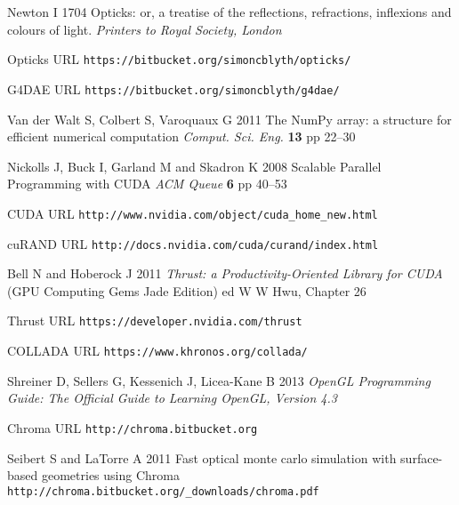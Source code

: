 \documentclass[a4paper]{jpconf}
\begin{document}
\begin{thebibliography}{9}
Newton I 
1704 
Opticks: or, a treatise of the reflections, refractions, inflexions and colours of light.
{\it Printers to Royal Society, London} 

Opticks URL {\tt https://bitbucket.org/simoncblyth/opticks/}

G4DAE URL {\tt https://bitbucket.org/simoncblyth/g4dae/}

Van der Walt S, Colbert S, Varoquaux G 
2011 
The NumPy array: a structure for efficient numerical computation
{\it Comput. Sci. Eng.} {\bf 13} pp 22--30

Nickolls J, Buck I, Garland M and Skadron K 
2008
Scalable Parallel Programming with CUDA
{\it ACM Queue} {\bf 6} pp 40--53

CUDA URL {\tt http://www.nvidia.com/object/cuda\_home\_new.html}

cuRAND URL {\tt http://docs.nvidia.com/cuda/curand/index.html}


Bell N and Hoberock J 
2011
{\it Thrust: a Productivity-Oriented Library for CUDA}
(GPU Computing Gems Jade Edition) ed W W Hwu, Chapter 26   

Thrust URL {\tt https://developer.nvidia.com/thrust}

COLLADA URL {\tt https://www.khronos.org/collada/}

Shreiner D, Sellers G, Kessenich J, Licea-Kane B 
2013
{\it OpenGL Programming Guide: The Official Guide to Learning OpenGL, Version 4.3}


Chroma URL {\tt http://chroma.bitbucket.org}

Seibert S and LaTorre A 
2011 
Fast optical monte carlo simulation with surface-based geometries using Chroma {\tt http://chroma.bitbucket.org/\_downloads/chroma.pdf}


\end{thebibliography}
\end{document}
